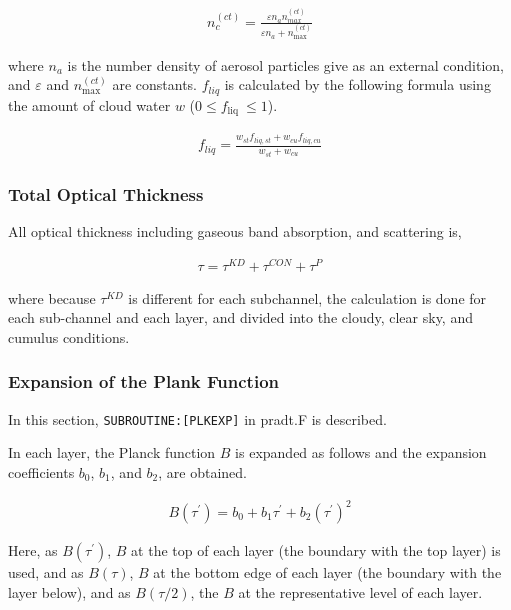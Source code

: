 \begin{eqnarray}
n_{c}^{(c t)}=\frac{\varepsilon n_{a} n_{m a x}^{(c t)}}{\varepsilon n_{a}+n_{\max }^{(c t)}}
\end{eqnarray}

where \(n_a\) is the number density of aerosol particles give as an external condition, and \(\varepsilon\) and \(n_{\max }^{(c t)}\) are constants. \(f_{liq}\) is calculated by the following formula
using the amount of cloud water \(w\) (\(0 \leq f_{\text {liq }} \leq 1\)).

\begin{eqnarray}
f_{l i q}=\frac{w_{s t} f_{l i q, s t}+w_{c u} f_{l i q, c u}}{w_{s t}+w_{c u}}
\end{eqnarray}

\hypertarget{total-optical-thickness}{%
\subsubsection{Total Optical Thickness}\label{total-optical-thickness}}

All optical thickness including gaseous band absorption, and scattering is,

\begin{eqnarray}
\tau=\tau^{K D}+\tau^{C O N}+\tau^{P}
\end{eqnarray}

where because \(\tau^{K D}\) is different for each subchannel, the calculation is done for each sub-channel and each layer, and divided into the cloudy, clear sky, and cumulus conditions.

\hypertarget{expansion-of-the-plank-function}{%
\subsubsection{Expansion of the Plank Function}\label{expansion-of-the-plank-function}}

In this section, \texttt{SUBROUTINE:{[}PLKEXP{]}} in pradt.F is described.

In each layer, the Planck function \(B\) is expanded as follows and the expansion coefficients \(b_0\), \(b_1\), and \(b_2\), are obtained.

\begin{eqnarray}
{B}\left(\tau^{\prime}\right)=b_{0}+b_{1} \tau^{\prime}+b_{2}\left(\tau^{\prime}\right)^{2}
\end{eqnarray}

Here, as \({B}\left(\tau^{\prime}\right)\), \(B\) at the top of each layer (the boundary with the top layer) is used, and as \({B}(\tau)\), \(B\) at the bottom edge of each layer (the boundary with
the layer below), and as \({B}(\tau / 2)\), the \(B\) at the representative level of each layer.

